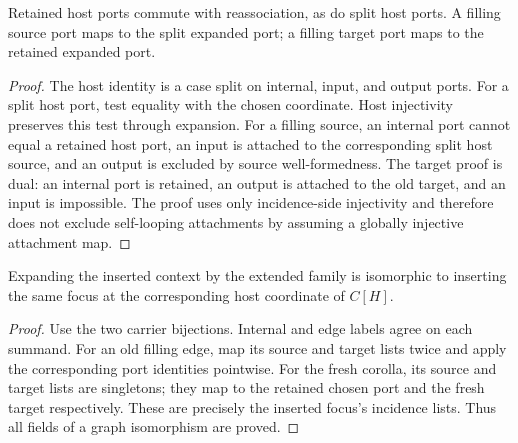 

\begin{lemma}
Retained host ports commute with reassociation, as do split host ports.
A filling source port maps to the split expanded port; a filling target port
maps to the retained expanded port.
\end{lemma}
\begin{proof}
The host identity is a case split on internal, input, and output ports.
For a split host port, test equality with the chosen coordinate. Host
injectivity preserves this test through expansion. For a filling source,
an internal port cannot equal a retained host port, an input is attached to
the corresponding split host source, and an output is excluded by source
well-formedness. The target proof is dual: an internal port is retained, an
output is attached to the old target, and an input is impossible. The proof
uses only incidence-side injectivity and therefore does not exclude self-looping
attachments by assuming a globally injective attachment map.
\end{proof}





\begin{theorem}
Expanding the inserted context by the extended family is isomorphic to
inserting the same focus at the corresponding host coordinate of $C[H]$.
\end{theorem}
\begin{proof}
Use the two carrier bijections. Internal and edge labels agree on each
summand. For an old filling edge, map its source and target lists twice and
apply the corresponding port identities pointwise. For the fresh corolla,
its source and target lists are singletons; they map to the retained chosen
port and the fresh target respectively. These are precisely the inserted
focus's incidence lists. Thus all fields of a graph isomorphism are proved.
\end{proof}


